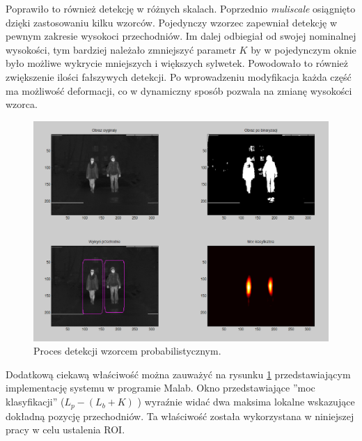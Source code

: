 Poprawiło to również detekcję w różnych skalach. Poprzednio \textit{muliscale} osiągnięto dzięki zastosowaniu kilku wzorców. Pojedynczy wzorzec zapewniał detekcję w pewnym zakresie wysokoci przechodniów. Im dalej odbiegiał od swojej nominalnej wysokości, tym bardziej należało zmniejszyć parametr $K$ by w pojedynczym oknie było możliwe wykrycie mniejszych i większych sylwetek. Powodowało to również zwiększenie ilości fałszywych detekcji. Po wprowadzeniu modyfikacja każda część ma możliwość deformacji, co w dynamiczny sposób pozwala na zmianę wysokości wzorca.

\begin{figure}
\centering
\includegraphics[width=0.8\linewidth]{images/sim_window.png}
\caption[Proces detekcji wzorcem probabilistycznym.]{Proces detekcji wzorcem probabilistycznym. \cite{kankaing}}
\label{fig:sim_window}
\end{figure}

Dodatkową ciekawą właściwość można zauważyć na rysunku \ref{fig:sim_window} przedstawiającym implementację systemu w programie Malab. Okno przedstawiające ''moc klasyfikacji'' ($L_p - (L_b + K)$ ) wyraźnie widać dwa maksima lokalne wskazujące dokładną pozycję przechodniów. Ta właściwość została wykorzystana w niniejszej pracy w celu ustalenia ROI.



